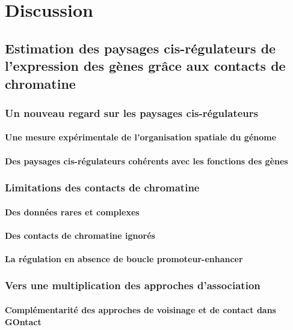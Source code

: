 \chapter{Discussion}
{\hypersetup{linkcolor=GREYDARK}\minitoc}
\label{chap:discussion}

\section{Estimation des paysages cis-régulateurs de l’expression des gènes grâce aux contacts de chromatine}

\subsection{Un nouveau regard sur les paysages cis-régulateurs}
\subsubsection*{Une mesure expérimentale de l’organisation spatiale du génome}
\subsubsection*{Des paysages cis-régulateurs cohérents avec les fonctions des gènes}

\subsection{Limitations des contacts de chromatine}
\subsubsection*{Des données rares et complexes}
\subsubsection*{Des contacts de chromatine ignorés}
\subsubsection*{La régulation en absence de boucle promoteur-enhancer}

\subsection{Vers une multiplication des approches d’association}
\subsubsection*{Complémentarité des approches de voisinage et de contact dans GOntact}
